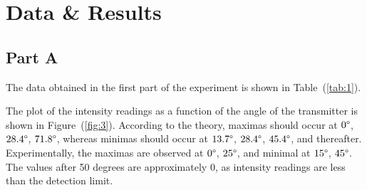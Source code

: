 \documentclass[10pt]{article}
\begin{document}
\section{Data \& Results}

\subsection*{Part A}

The data obtained in the first part of the experiment is shown in Table~(\ref{tab:1}).

The plot of the intensity readings as a function of the angle of the transmitter is shown in Figure~(\ref{fig:3}).
According to the theory, maximas should occur at $0\degree$, $28.4\degree$, $71.8\degree$, whereas minimas should occur at $13.7\degree$, $28.4\degree$, $45.4\degree$, and thereafter.
Experimentally, the maximas are observed at $0\degree$, $25\degree$, and minimal at $15\degree$, $45\degree$. The values after 50 degrees are approximately 0, as intensity readings are less than the detection limit.
\end{document}
